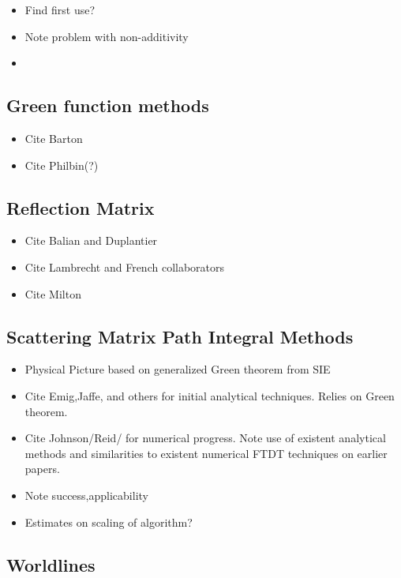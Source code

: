\begin{itemize}
\item Find first use?
\item Note problem with non-additivity
\item 
\end{itemize}

\subsection{Green function methods}

\begin{itemize}
\item Cite Barton
\item Cite Philbin(?)
\end{itemize}

\subsection{Reflection Matrix}

\begin{itemize}
\item Cite Balian and Duplantier
\item Cite Lambrecht and French collaborators
\item Cite Milton
\end{itemize}

\subsection{Scattering Matrix Path Integral Methods}

\begin{itemize}
\item Physical Picture based on generalized Green theorem from SIE
\item Cite Emig,Jaffe,  and others for initial analytical techniques.  Relies on Green theorem.
\item Cite Johnson/Reid/ for numerical progress.  Note use of existent analytical methods and similarities to existent numerical FTDT techniques on earlier papers.  
\item Note success,applicability
\item Estimates on scaling of algorithm?
\end{itemize}

\subsection{Worldlines}

